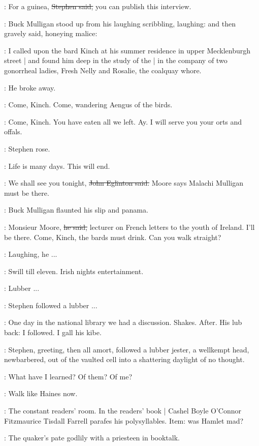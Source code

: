 \Stephen:
For a guinea,
\sout{Stephen said,}
you can publish this interview.

:
Buck Mulligan stood up from his laughing scribbling,
laughing:
and then gravely said,
honeying malice:

\mulligan:
I called upon the bard Kinch at his summer residence in upper Mecklenburgh street |
and found him deep in the study of the  |
in the company of two gonorrheal ladies,
Fresh Nelly and Rosalie,
the coalquay whore.

:
He broke away.

\mulligan:
Come, Kinch.
Come, wandering Aengus of the birds.

\StephenInt:
Come, Kinch.
You have eaten all we left.
Ay.
I will serve you your orts and offals.

:
Stephen rose.

\StephenInt:
Life is many days.
This will end.

\eglinton:
We shall see you tonight,
\sout{John Eglinton said.}
 Moore says Malachi Mulligan must be there.

:
Buck Mulligan flaunted his slip and panama.

\mulligan:
Monsieur Moore,
\sout{he said,}
lecturer on French letters to the youth of Ireland.
I'll be there.
Come, Kinch,
the bards must drink.
Can you walk straight?

:
Laughing, he ...

\StephenInt:
Swill till eleven.
Irish nights entertainment.

\StephenInt:
Lubber ...

\StephenInt:
Stephen followed a lubber ...

\StephenInt:
One day in the national library we had a discussion.
Shakes.
After.
His lub back:
I followed.
I gall his kibe.

:
Stephen,
greeting,
then all amort,
followed
a lubber jester,
a wellkempt head,
newbarbered,
out of the vaulted cell
into a shattering daylight of no thought.

\StephenInt:
What have I learned?
Of them?
Of me?

\StephenInt:
Walk like Haines now.

\StephenInt:
The constant readers' room.
In the readers' book |
Cashel Boyle O'Connor Fitzmaurice Tisdall Farrell parafes his polysyllables.
Item: was Hamlet mad?

:
The quaker's pate godlily with a priesteen in booktalk.

